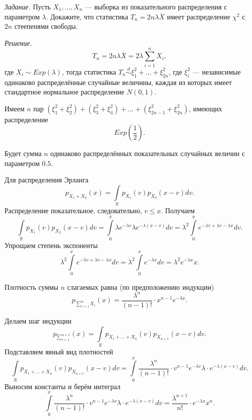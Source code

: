 \textit{Задание.}
Пусть $X_1, \dotsc, X_n$ --- выборка из показательного распределения с параметром $ \lambda $.
Докажите,
что статистика $T_n = 2n \lambda \overline{X}$ имеет распределение $ \chi^2$ с $2n$
стеепенями свободы.

\textit{Решение.}
$$T_n =
  2n \lambda \overline{X} =
  2 \lambda \sum \limits_{i = 1}^n X_i,$$
где $X_i \sim Exp \left( \lambda \right) $,
тогда статистика $T_n \overset{d}{ \sim } \xi_1^2 + \dotsc + \xi_{2n}^2$, где $ \xi_i^2$ ---
независимые одинаково распределённые случайные величины,
каждая из которых имеет стандартное нормальное распределение $N \left( 0, 1 \right) $.

Имеем $n$ пар
$ \left( \xi_1^2 + \xi_2^2 \right) + \left( \xi_3^2 + \xi_4^2 \right) + \dotsc +
  \left( \xi_{2n - 1}^2 + \xi_{2n}^2 \right)$,
имеющих распределение
$$Exp \left( \frac{1}{2} \right).$$

Будет сумма $n$ одинаково распределённых показательных случайных величин с параметром $0.5$.

Для распределения Эрланга
$$p_{X_1 + X_2} \left( x \right) =
  \int \limits_{ \mathbb{R}} p_{X_1} \left( v \right) p_{X_2} \left( x - v \right) dv.$$
Распределение показательное, следовательно, $v \leq x$.
Получаем
$$ \int \limits_{ \mathbb{R}} p_{X_1} \left( v \right) p_{X_2} \left( x - v \right) dv =
  \int \limits_0^x \lambda e^{- \lambda v} \lambda e^{- \lambda \left( x - v \right) } dv =
  \lambda^2 \int \limits_0^x e^{- \lambda v + \lambda v - \lambda x} dv.$$
Упрощаем степень экспоненты
$$ \lambda^2 \int \limits_0^x e^{- \lambda v + \lambda v - \lambda x} dv =
  \lambda^2 \int \limits_0^x e^{- \lambda x} dv =
  \lambda^2 e^{- \lambda x} x.$$

Плотность суммы $n$ слагаемых равна (по предположению индукции)
$$p_{ \sum \limits_{i = 1}^n X_i} \left( x \right) =
  \frac{ \lambda^n}{ \left( n - 1 \right)!} \cdot x^{n - 1} e^{- \lambda x}.$$

Делаем шаг индукции
$$p_{ \sum \limits_{i = 1}^{n + 1}} \left( x \right) =
  \int \limits_{ \mathbb{R}}
    p_{X_1 + \dotsc + X_n} \left( v \right) p_{X_{n + 1}} \left( x - v \right)
  dv.$$
Подставляем явный вид плотностей
$$ \int \limits_{ \mathbb{R}}
    p_{X_1 + \dotsc + X_n} \left( v \right) p_{X_{n + 1}} \left( x - v \right)
  dv =
  \int \limits_0^x
    \frac{ \lambda^n}{ \left( n - 1 \right)!} \cdot v^{n - 1} e^{- \lambda v} \lambda \cdot
    e^{- \lambda \left( x - v \right) }
  dv.$$
Выносим константы и берём интеграл
$$ \int \limits_0^x
    \frac{ \lambda^n}{ \left( n - 1 \right)!} \cdot v^{n - 1} e^{- \lambda v} \lambda \cdot
    e^{- \lambda \left( x - v \right) }
  dv =
  \frac{ \lambda^{n + 1}}{n!} \cdot e^{- \lambda x} x^n.$$

